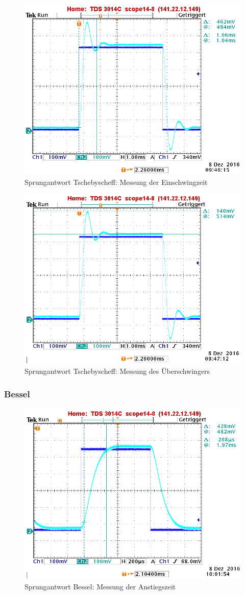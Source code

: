\begin{figure}[h]
	\centering
	\includegraphics[width=0.60\linewidth]{Bilder/ImLabor/Sprungantwort_5_4_Tscheby_Einschwingzeit}
	\caption{Sprungantwort Tschebyscheff: Messung der Einschwingzeit}
	\label{fig:Sprungantwort_5_4_Tscheby_Einschwingzeit}
\end{figure}

\begin{figure}[h]
\centering
\includegraphics[width=0.60\linewidth]{Bilder/ImLabor/Sprungantwort_5_5_Tscheby_Ueberschwinger}
\caption{Sprungantwort Tschebyscheff: Messung des Überschwingers}
\label{fig:Sprungantwort_5_5_Tscheby_Ueberschwinger}
\end{figure}

\newpage

\subsubsection{Bessel}

\begin{figure}[h]
\centering
\includegraphics[width=0.60\linewidth]{Bilder/ImLabor/Sprungantwort_5_1_Bessel_Anstiegszeit}
\caption{Sprungantwort Bessel: Messung der Anstiegszeit}
\label{fig:Sprungantwort_5_1_Bessel_Anstiegszeit_Anhang}
\end{figure}


